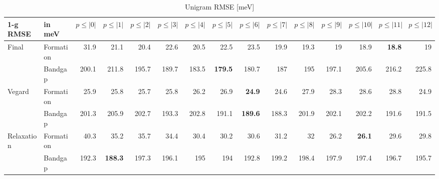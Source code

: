 \documentclass[11pt,oneside,czech,american]{book} %
\theoremstyle{definition} %
\theoremstyle{definition}
\begin{document}
\begin{table}[H]
	\scriptsize
	\centering
\begin{tabular}{llrrrrrrrrrrrrr}
	\hline
	1-g RMSE   & in meV    &   $p{\leq}|0|$ &   $p{\leq}|1|$ &   $p{\leq}|2|$ &   $p{\leq}|3|$ &   $p{\leq}|4|$ &   $p{\leq}|5|$ &   $p{\leq}|6|$ &   $p{\leq}|7|$ &   $p{\leq}|8|$ &   $p{\leq}|9|$ &   $p{\leq}|10|$ &   $p{\leq}|11|$ &   $p{\leq}|12|$ \\
	\hline
	\multirow{2}{*}{Final}      & Formation &       31.9 &       21.1 &       20.4 &       22.6 &       20.5 &       22.5 &       23.5 &       19.9 &       19.3 &       19   &        18.9 &        \textbf{18.8} &        19\\
	      & Bandgap   &      200.1 &      211.8 &      195.7 &      189.7 &      183.5 &      \textbf{179.5} &      180.7 &      187   &      195   &      197.1 &       205.6 &       216.2 &       225.8\\
	\multirow{2}{*}{Vegard}     & Formation &       25.9 &       25.8 &       25.7 &       25.8 &       26.2 &       26.9 &       \textbf{24.9} &       24.6 &       27.9 &       28.3 &        28.6 &        28.8 &        24.9\\
	     & Bandgap   &      201.3 &      205.9 &      202.7 &      193.3 &      202.8 &      191.1 &      \textbf{189.6} &      188.3 &      201.9 &      202.1 &       202.2 &       191.6 &       191.5\\
	\multirow{2}{*}{Relaxation} & Formation &       40.3 &       35.2 &       35.7 &       34.4 &       30.4 &       30.2 &       30.6 &       31.2 &       32   &       26.2 &        \textbf{26.1} &        29.6 &        29.8\\
	 & Bandgap   &      192.3 &      \textbf{188.3} &      197.3 &      196.1 &      195   &      194   &      192.8 &      199.2 &      198.4 &      197.9 &       197.4 &       196.7 &       195.7\\
	\hline
\end{tabular}
	\caption{Unigram RMSE [meV]}
	\label{1-g RMSE}
\end{table}
\end{document}
